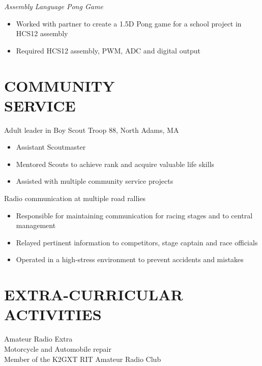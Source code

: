 \documentclass[line,margin]{res}
\begin{document}
\begin{resume}
	\vspace{-10pt}
	{\sl Assembly Language Pong Game}
		\begin{itemize} \itemsep -2pt
			\item Worked with partner to create a 1.5D Pong game for a school project in HCS12 assembly
			\item Required HCS12 assembly, PWM, ADC and digital output
		\end{itemize}
\section{COMMUNITY \\ SERVICE}  
	Adult leader in Boy Scout Troop 88, North Adams, MA
	\begin{itemize}  \itemsep -2pt %
		\item Assistant Scoutmaster
		\item Mentored Scouts to achieve rank and acquire valuable life skills%
		\item Assisted with multiple community service projects
	\end{itemize}
	\vspace{-5pt}
	Radio communication at multiple road rallies
	\begin{itemize}  \itemsep -2pt %
		\item Responsible for maintaining communication for racing stages and to central management
		\item Relayed pertinent information to competitors, stage captain and race officials
		\item Operated in a high-stress environment to prevent accidents and mistakes		
	\end{itemize}

\section{EXTRA-CURRICULAR \\ ACTIVITIES}             
	Amateur Radio Extra\\
	Motorcycle and Automobile repair\\
	Member of the K2GXT RIT Amateur Radio Club\\


\end{resume}
\end{document}
